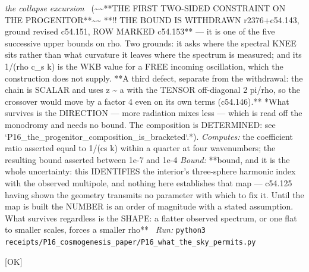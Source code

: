 \begin{description}
\textit{the collapse excursion} \ (\textasciitilde{}\textasciitilde{}**THE FIRST TWO-SIDED CONSTRAINT ON THE PROGENITOR**\textasciitilde{}\textasciitilde{} **!! THE BOUND IS WITHDRAWN r2376+c54.143, ground revised c54.151, ROW MARKED c54.153** --- it is one of the five successive upper bounds on rho. Two grounds: it asks where the spectral KNEE sits rather than what curvature it leaves where the spectrum is measured; and its 1/(rho c\_s k) is the WKB value for a FREE incoming oscillation, which the construction does not supply. **A third defect, separate from the withdrawal: the chain is SCALAR and uses z \textasciitilde{} a with the TENSOR off-diagonal 2 pi/rho, so the crossover would move by a factor 4 even on its own terms (c54.146).** *What survives is the DIRECTION --- more radiation mixes less --- which is read off the monodromy and needs no bound. The composition is DETERMINED: see `P16\_the\_progenitor\_composition\_is\_bracketed`.*). 
\emph{Computes:} the coefficient ratio asserted equal to 1/(cs k) within a quarter at four wavenumbers; the resulting bound asserted between 1e-7 and 1e-4
 \emph{Bound:} **bound, and it is the whole uncertainty: this IDENTIFIES the interior's three-sphere harmonic index with the observed multipole, and nothing here establishes that map --- c54.125 having shown the geometry transmits no parameter with which to fix it. Until the map is built the NUMBER is an order of magnitude with a stated assumption. What survives regardless is the SHAPE: a flatter observed spectrum, or one flat to smaller scales, forces a smaller rho**
\ \emph{Run:} \texttt{python3 receipts/P16\_cosmogenesis\_paper/P16\_what\_the\_sky\_permits.py}
\item[\label{rcpt:P16_the_interior_to_observed_mode_map}\texttt{P16\_the\_interior\_to\_observed\_mode\_map}]\hfill\textsf{[OK]}\\

\end{description}
